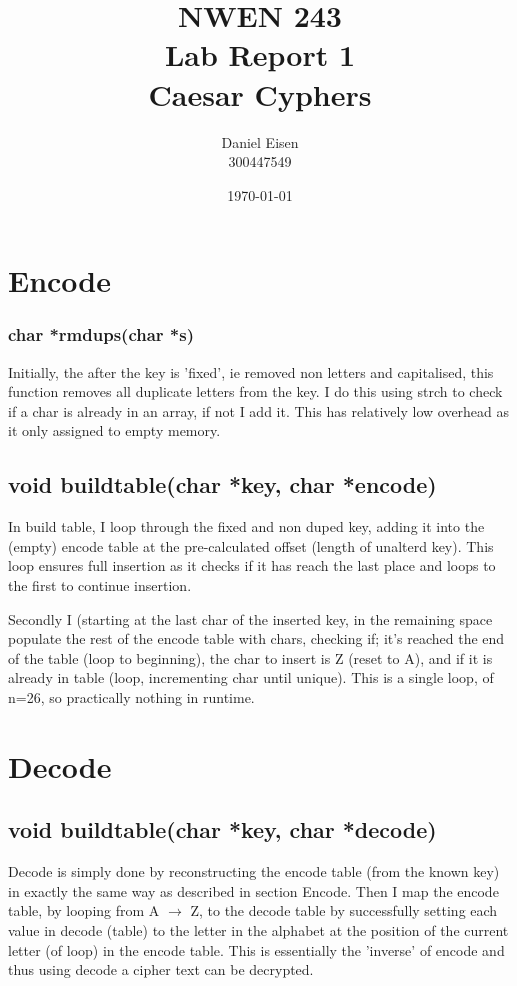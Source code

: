 \documentclass[a4paper,11pt]{article}
\title{NWEN 243 \\ Lab Report 1 \\ Caesar Cyphers}
\author{Daniel Eisen \\ 300447549}
\date{\today}
\begin{document}
	\maketitle

\section*{Encode}
	\subsubsection*{char *rmdups(char *s)}
	Initially, the after the key is 'fixed', ie removed non letters and capitalised, this function removes all duplicate letters from the key.
	I do this using strch to check if a char is already in an array, if not I add it.
	This has relatively low overhead as it only assigned to empty memory.
	
	\subsection*{void buildtable(char *key, char *encode)}
			In build table, I loop through the fixed and non duped key, adding it into the (empty) encode table at the pre-calculated offset (length of unalterd key). This loop ensures full insertion as it checks if it has reach the last place and loops to the first to continue insertion.
			
			Secondly I (starting at the last char of the inserted key, in the remaining space populate the rest of the encode table with chars, checking if; it's reached the end of the table (loop to beginning), the char to insert is Z (reset to A), and if it is already in table (loop, incrementing char until unique).
			This is a single loop, of n=26, so practically nothing in runtime. 
\section*{Decode}
	\subsection*{void buildtable(char *key, char *decode)}
	Decode is simply done by reconstructing the encode table (from the known key) in exactly the same way as described in section Encode. Then I map the encode table, by looping from A $\rightarrow$ Z, to the decode table by successfully setting each value in decode (table) to the letter in the alphabet at the position of the current letter (of loop) in the encode table.
	This is essentially the 'inverse' of encode and thus using decode a cipher text can be decrypted.
	
\end{document}
